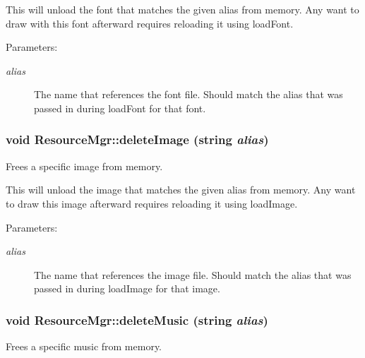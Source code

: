 This will unload the font that matches the given alias from memory. Any want to draw with this font afterward requires reloading it using loadFont. \begin{Desc}
\item[Parameters:]
\begin{description}
\item[{\em alias}]The name that references the font file. Should match the alias that was passed in during loadFont for that font. \end{description}
\end{Desc}
\hypertarget{class_resource_mgr_c199d347884e8187eecbcb753cc57391}{
\subsubsection[{deleteImage}]{\setlength{\rightskip}{0pt plus 5cm}void ResourceMgr::deleteImage (string {\em alias})}}
\label{class_resource_mgr_c199d347884e8187eecbcb753cc57391}


Frees a specific image from memory. 

This will unload the image that matches the given alias from memory. Any want to draw this image afterward requires reloading it using loadImage. \begin{Desc}
\item[Parameters:]
\begin{description}
\item[{\em alias}]The name that references the image file. Should match the alias that was passed in during loadImage for that image. \end{description}
\end{Desc}
\hypertarget{class_resource_mgr_bf514587922758b910af8f728e452020}{
\subsubsection[{deleteMusic}]{\setlength{\rightskip}{0pt plus 5cm}void ResourceMgr::deleteMusic (string {\em alias})}}
\label{class_resource_mgr_bf514587922758b910af8f728e452020}


Frees a specific music from memory. 

